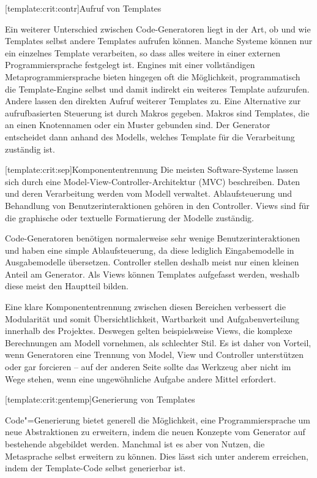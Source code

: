 \documentclass[11pt, a4paper, bibgerm]{scrbook}
\newcommand\lsubsection{}
\newcommand{\cgen}{Code"=Generierung}
\begin{document}
\lsubsection[template:crit:contr]{Aufruf von Templates}

Ein weiterer Unterschied zwischen Code-Generatoren liegt in der Art, ob
und wie Templates selbst andere Templates aufrufen können. Manche
Systeme können nur ein einzelnes Template verarbeiten, so dass alles
weitere in einer externen Programmiersprache festgelegt ist. Engines mit
einer vollständigen Metaprogrammiersprache bieten hingegen oft die
Möglichkeit, programmatisch die Template-Engine selbst und damit
indirekt ein weiteres Template aufzurufen. Andere lassen den direkten
Aufruf weiterer Templates zu. Eine Alternative zur aufrufbasierten
Steuerung ist durch Makros gegeben. Makros sind Templates, die an einen
Knotennamen oder ein Muster gebunden sind. Der Generator entscheidet
dann anhand des Modells, welches Template für die Verarbeitung zuständig
ist.

\lsubsection[template:crit:sep]{Komponententrennung}
Die meisten Software-Systeme lassen sich durch eine
Model-View-Controller-Architektur (MVC) \cite[S.5ff]{DesignPatterns} beschreiben. Daten und deren
Verarbeitung werden vom Modell verwaltet. Ablaufsteuerung und Behandlung
von Benutzerinteraktionen gehören in den Controller. Views sind für die
graphische oder textuelle Formatierung der Modelle zuständig.

Code-Generatoren benötigen normalerweise sehr wenige
Benutzerinteraktionen und haben eine simple Ablaufsteuerung, da diese
lediglich Eingabemodelle in Ausgabemodelle übersetzen. Controller
stellen deshalb meist nur einen kleinen Anteil am Generator. Als Views
können Templates aufgefasst werden, weshalb diese meist den Hauptteil
bilden.

Eine klare Komponententrennung zwischen diesen Bereichen verbessert die
Modularität und somit Übersichtlichkeit, Wartbarkeit und
Aufgabenverteilung innerhalb des Projektes. Deswegen gelten
beispielsweise Views, die komplexe Berechnungen am Modell vornehmen, als
schlechter Stil. Es ist daher von Vorteil, wenn Generatoren eine
Trennung von Model, View und Controller unterstützen oder gar forcieren
-- auf der anderen Seite sollte das Werkzeug aber nicht im Wege stehen, wenn
eine ungewöhnliche Aufgabe andere Mittel erfordert.

\lsubsection[template:crit:gentemp]{Generierung von Templates}

\cgen{} bietet generell die Möglichkeit, eine Programmiersprache um neue
Abstraktionen zu erweitern, indem die neuen Konzepte vom Generator auf
bestehende abgebildet werden. Manchmal ist es aber von Nutzen, die
Metasprache selbst erweitern zu können. Dies lässt sich unter anderem
erreichen, indem der Template-Code selbst generierbar ist.
\end{document}
